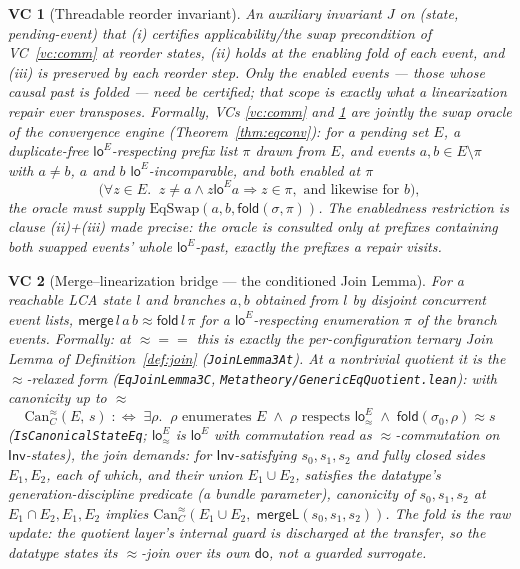 \documentclass[11pt]{article}
\newtheorem{vc}{VC}
\newcommand{\mergeL}{\mathsf{mergeL}}
\newcommand{\Sinit}{\sigma_0}
\newcommand{\loE}[1]{\mathsf{lo}^{#1}}
\newcommand{\lean}[1]{\texttt{#1}}
\newcommand{\st}{\sigma}
\newcommand{\dodo}{\mathsf{do}}
\newcommand{\merge}{\mathsf{merge}}
\newcommand{\eqobs}{\approx}
\newcommand{\fold}{\mathsf{fold}}
\newcommand{\Inv}{\mathsf{Inv}}
\begin{document}
\begin{vc}[Threadable reorder invariant]\label{vc:inv}
An auxiliary invariant $J$ on (state, pending-event) that (i) certifies applicability/the
swap precondition of VC~\ref{vc:comm} at reorder states, (ii) holds at the enabling fold of
each event, and (iii) is preserved by each reorder step. Only the \emph{enabled} events ---
those whose causal past is folded --- need be certified; that scope is exactly what a
linearization repair ever transposes. Formally, VCs \ref{vc:comm} and \ref{vc:inv} are
jointly the \emph{swap oracle} of the convergence engine
(Theorem~\ref{thm:eqconv}): for a pending set $E$, a duplicate-free
$\loE{E}$-respecting prefix list $\pi$ drawn from $E$, and events
$a, b \in E \setminus \pi$ with $a \neq b$, $a$ and $b$ $\loE{E}$-incomparable, and both
\emph{enabled} at $\pi$
\[
  \bigl(\forall z \in E.\;\; z \neq a \wedge z \mathrel{\loE{E}} a \Rightarrow z \in
  \pi, \text{ and likewise for } b\bigr),
\]
the oracle must supply $\mathrm{EqSwap}(a, b, \fold(\st, \pi))$. The enabledness
restriction is clause (ii)+(iii) made precise: the oracle is consulted only at prefixes
containing both swapped events' whole $\loE{E}$-past, exactly the prefixes a repair
visits.
\end{vc}

\begin{vc}[Merge--linearization bridge --- the conditioned Join Lemma]\label{vc:merge}
For a reachable LCA state $l$ and branches $a,b$ obtained from $l$ by disjoint concurrent
event lists, $\merge\,l\,a\,b \eqobs \fold\,l\,\pi$ for a $\loE{E}$-respecting enumeration $\pi$
of the branch events. Formally: at ${\eqobs} = {=}$ this is exactly the
per-configuration ternary Join Lemma of Definition~\ref{def:join}
(\lean{JoinLemma3At}). At a nontrivial quotient it is the $\eqobs$-relaxed form
(\lean{EqJoinLemma3C}, \lean{Metatheory/GenericEqQuotient.lean}): with canonicity up
to $\eqobs$
\[
  \mathrm{Can}^{\eqobs}_C(E,\, s) \;:\Longleftrightarrow\; \exists \rho.\;\;
  \rho \text{ enumerates } E \;\wedge\;
  \rho \text{ respects } \mathsf{lo}^{E}_{\eqobs} \;\wedge\;
  \fold(\Sinit, \rho) \eqobs s
\]
(\lean{IsCanonicalStateEq}; $\mathsf{lo}^{E}_{\eqobs}$ is $\loE{E}$ with commutation
read as $\eqobs$-commutation on $\Inv$-states), the join demands: for $\Inv$-satisfying
$s_0, s_1, s_2$ and \emph{fully closed} sides $E_1, E_2$, each of which,
\emph{and their union} $E_1 \cup E_2$, satisfies the
datatype's generation-discipline predicate (a bundle parameter), canonicity of
$s_0, s_1, s_2$ at $E_1 \cap E_2, E_1, E_2$ implies
$\mathrm{Can}^{\eqobs}_C(E_1 \cup E_2,\; \mergeL(s_0, s_1, s_2))$. The fold is the
\emph{raw} update: the quotient layer's internal guard is discharged at the transfer,
so the datatype states its $\eqobs$-join over its own $\dodo$, not a guarded
surrogate.
\end{vc}
\end{document}
